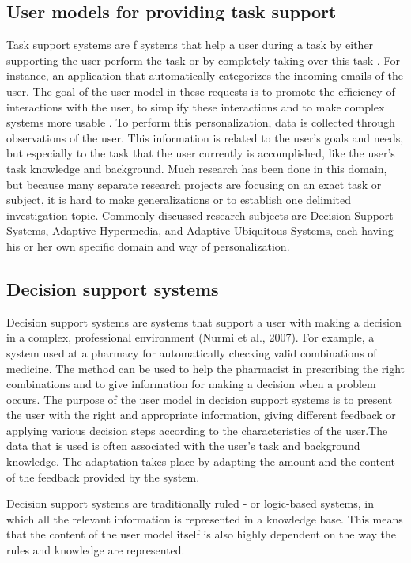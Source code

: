 \subsection{User models for providing task support}

Task support systems are f systems that help a user during a task by either
supporting the user perform the task or by completely taking over this task
\cite{brun2010compass}. For instance,  an application that
automatically categorizes the incoming emails of the user. The goal of the user
model in these requests is to promote the efficiency of interactions with the
user, to simplify these interactions and to make complex systems more usable
\cite{razmerita2009user}\cite{fischer2001user}.
To perform this personalization, data is
collected through observations of the user. This information is related to the
user’s goals and needs, but especially to the task that the user currently is
accomplished, like the user’s task knowledge and background. Much research has
been done in this domain, but because many separate research projects are
focusing on an exact task or subject, it is hard to make
generalizations or to establish one delimited investigation topic. Commonly
discussed research subjects are Decision Support Systems,  Adaptive Hypermedia,
and Adaptive Ubiquitous Systems, each having his or her own specific domain and
way of personalization.

\subsection{Decision support systems}

Decision support systems are systems that support a user with making a decision
in a complex, professional environment \cite{} (Nurmi et al., 2007). For example,  a
system used at a pharmacy for automatically checking valid combinations of
medicine. The method can be used to help the pharmacist in prescribing the right
combinations and to give information for making a decision when a problem
occurs. The purpose of the user model in decision support systems is to present
the user with the right and appropriate information, giving different feedback
or applying various decision steps according to the characteristics of the
user.The data that is used is often associated with the user’s task and
background knowledge. The adaptation takes place by adapting the amount and
the content of the feedback provided by the system.


Decision support systems are traditionally ruled ‐ or logic-based systems, in
which all the relevant information is represented in a knowledge base. This
means that the content of the user model itself is also highly dependent on the
way the rules and knowledge are represented.


